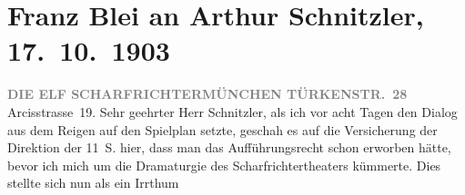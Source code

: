 

         
         \renewcommand{\erwaehntePersonen}{Personen: Franz Blei, Fanny Johnson}
         \renewcommand{\erwaehnteInstitutionen}{Institutionen: Die elf Scharfrichter}
         \renewcommand{\erwaehnteOrte}{Orte: Arcisstraße, Edmund-Weiß-Gasse 7, England, Frankgasse 1, München, Türkenstraße (München), Wien}
         \renewcommand{\erwaehnteWerke}{Werke: Der grüne Kakadu. Groteske in einem Akt, Reigen. Zehn Dialoge}
               \section[Franz Blei an Arthur Schnitzler, 17. 10. 1903]{ Franz Blei an Arthur Schnitzler, 17. 10. 1903}\nopagebreak{}\rehead{ }\begin{ledgroupsized}[t]{13cm}\normalsize\beginnumbering{} \toendnotes[C]{\smallbreak\pagebreak[2]} 
\toendnotes[C]{\smallbreak}\pstart
           \noindent{}\centering{}{\pb}\textcolor{gray}{\textbf{DIE ELF SCHARFRICHTERMÜNCHEN TÜRKENSTR. 28}}\pend
           \pstart
           \noindent{}\raggedleft{}Arcisstrasse 19. \pend
           \pstart{}Sehr geehrter Herr Schnitzler,\pend\pstart
           als ich vor acht Tagen den Dialog aus dem Reigen
               auf den Spielplan setzte, geschah es auf die Versicherung der Direktion der 11 S. hier, dass man das Aufführungsrecht schon
               erworben hätte, bevor ich mich um die Dramaturgie des Scharfrichtertheaters kümmerte. Dies stellte sich nun als ein Irrthum

\end{ledgroupsized}
